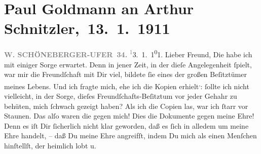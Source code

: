                \section[ Paul Goldmann an Arthur Schnitzler, 13. 1. 1911]{ Paul Goldmann an Arthur Schnitzler, 13. 1. 1911}\nopagebreak{}\rehead{ }\begin{ledgroupsized}[t]{13cm}\normalsize\beginnumbering{} \toendnotes[C]{\smallbreak\pagebreak[2]} 
\toendnotes[C]{\smallbreak}\pstart
           \noindent{}\raggedleft{}{\pb}\textcolor{gray}{\textbf{W. SCHÖNEBERGER-UFER 34.}}\pend
           \substVorne{}\textsuperscript{\textcolor{gray}{1}}\substDazwischen{}3\substHinten{}. 1. 1\substVorne{}\textsuperscript{0}\substDazwischen{}1\substHinten{}.\pend
           \pstart\center{}Lieber Freund,\pend\pstart
           Die \label{K_L03475-1v}\label{K_L03475-1h} habe ich mit einiger Sorge erwartet. Denn in jener Zeit, in der dieſe
               Angelegenheit ſpielt, war mir die Freundſchaft mit Dir  viel, bildete ſie eines der großen Beſitztümer meines Lebens. Und ich
               fragte mich, ehe ich die Kopien erhielt\substVorne{}\textsuperscript{,}\substDazwischen{}:\substHinten{} ſollte ich nicht vielleicht, in der Sorge, dieſes Freundſchafts-Beſitztum
               vor jeder Gehahr zu behüten, mich ſchwach gezeigt haben?\pend
           \pstart
           Als ich die Copien las, war ich ſtarr vor Staunen. Das alſo waren {\pb}die \label{K_L03475-2v}\label{K_L03475-2h} gegen mich! Dies die Dokumente gegen meine Ehre! Denn es iſt Dir ſicherlich
               nicht klar geworden, daß es ſich in alledem um meine Ehre handelt, – daß Du meine
               Ehre angreifſt, indem Du mich als einen Menſchen hinſtellſt, der heimlich lobt u.

\end{ledgroupsized}
